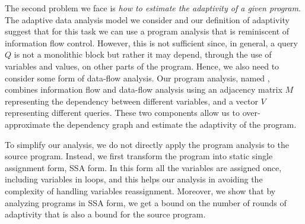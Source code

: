 The second problem we face is \emph{how to estimate the adaptivity of a given program}. The adaptive data analysis model we consider and our definition of adaptivity suggest that for this task we can use a  program analysis that is reminiscent of information flow control. However, this is not sufficient since, in general, a query $Q$ is not a monolithic block but rather it may depend, through the use of variables and values, on other parts of the program. Hence, we also need to consider some form of data-flow analysis. Our program analysis, named {\THESYSTEM}, combines information flow and data-flow analysis using an adjacency matrix $M$ representing the dependency between different variables, and a vector $V$ representing different queries. These two components allow us to over-approximate the dependency graph and estimate the adaptivity of the program. 

To simplify our analysis, we do not directly apply the program analysis to the source program. Instead, we first transform the program into static single assignment form, SSA form. In this form all the variables are assigned once, including variables in loops, and this helps our analysis in avoiding the complexity of handling variables reassignment. Moreover, we show that by analyzing programs in SSA form, we get a bound on the number of rounds of adaptivity that is also a bound for the source program.



